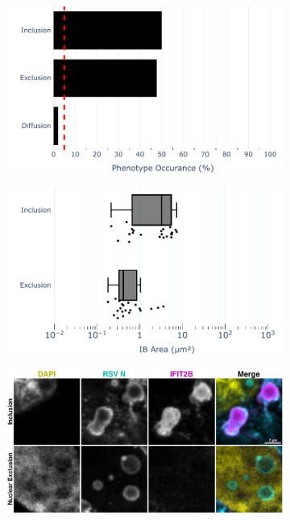 \begin{figure}
    \begin{subfigure}{0.5\textwidth}
        \caption{}
        \includegraphics[width=1\linewidth]{10. Chapter 5/Figs/03. IFIT2-FLAG/02. IFIT2B/01. bar_i2b_hnhp.pdf} 
    \end{subfigure}
    \begin{subfigure}{0.5\textwidth}
        \caption{}
        \includegraphics[width=1\linewidth]{10. Chapter 5/Figs/03. IFIT2-FLAG/02. IFIT2B/02. box_i2a_hnhp.pdf}
    \end{subfigure}
    \begin{subfigure}{1\textwidth}
        \centering
        \caption{}
        \includegraphics[width=1\linewidth]{10. Chapter 5/Figs/03. IFIT2-FLAG/02. IFIT2B/03. i2b-hi2f-hnhp.pdf}

\end{subfigure}
\end{figure}
